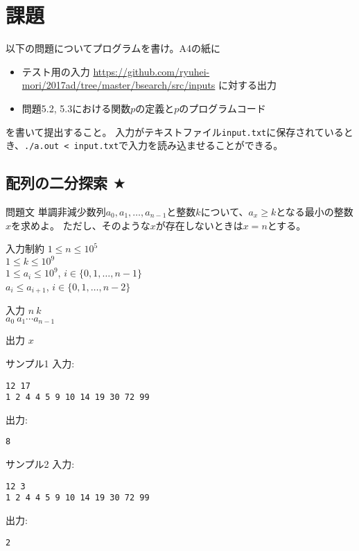 \documentclass[a4paper,twoside,onecolumn,openany,article,10pt]{memoir}
\theoremstyle{remark}
\begin{document}
\section{課題}\label{sec:assign}
以下の問題についてプログラムを書け。A4の紙に
\begin{itemize}
\item テスト用の入力 \url{https://github.com/ryuhei-mori/2017ad/tree/master/bsearch/src/inputs} に対する出力
\item 問題5.2, 5.3における関数$p$の定義と$p$のプログラムコード
\end{itemize}
を書いて提出すること。
入力がテキストファイル\texttt{input.txt}に保存されているとき、\texttt{./a.out < input.txt}で入力を読み込ませることができる。


\subsection{配列の二分探索 $\bigstar$}
\begin{itembox}[l]{問題文}
単調非減少数列$a_0, a_1,\dotsc, a_{n-1}$と整数$k$について、$a_x\ge k$となる最小の整数$x$を求めよ。
ただし、そのような$x$が存在しないときは$x=n$とする。
\end{itembox}

\begin{itembox}[l]{入力制約}
$1\le n\le 10^5$\\
$1\le k\le 10^9$\\
$1\le a_i\le 10^9$,\hspace{2em} $i\in\{0,1,\dotsc,n-1\}$\\
$a_i\le a_{i+1}$,\hspace{2em} $i\in\{0,1,\dotsc,n-2\}$
\end{itembox}

\begin{itembox}[l]{入力}
$n~k$\\
$a_0~a_1 \dotsb a_{n-1}$
\end{itembox}

\begin{itembox}[l]{出力}
$x$
\end{itembox}

\noindent
\begin{minipage}[t]{0.5\hsize}
\begin{itembox}[l]{サンプル1}
入力:
\begin{verbatim}
12 17
1 2 4 4 5 9 10 14 19 30 72 99
\end{verbatim}
出力:
\begin{verbatim}
8
\end{verbatim}
\end{itembox}
\end{minipage}
%
\begin{minipage}[t]{0.5\hsize}
\begin{itembox}[l]{サンプル2}
入力:
\begin{verbatim}
12 3
1 2 4 4 5 9 10 14 19 30 72 99
\end{verbatim}
出力:
\begin{verbatim}
2
\end{verbatim}
\end{itembox}
\end{minipage}
\end{document}
